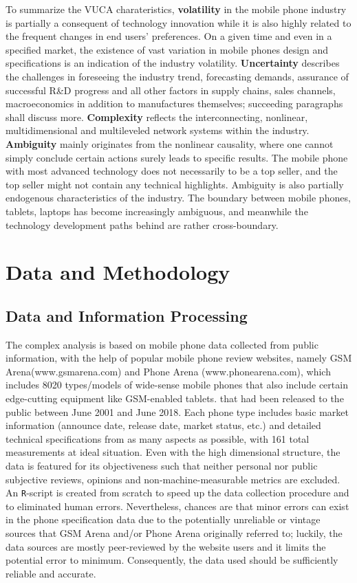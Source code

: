 \documentclass[utf8,english]{gradu3}
\begin{document}
To summarize the VUCA charateristics, \textbf{volatility} in the mobile phone industry is partially a consequent of technology innovation while it is also highly related to the frequent changes in end users’ preferences. On a given time and even in a specified market, the existence of vast variation in mobile phones design and specifications is an indication of the industry volatility. \textbf{Uncertainty} describes the challenges in foreseeing the industry trend, forecasting demands, assurance of successful R\&D progress and all other factors in supply chains, sales channels, macroeconomics in addition to manufactures themselves; succeeding paragraphs shall discuss more. \textbf{Complexity} reflects the interconnecting, nonlinear, multidimensional and multileveled network systems within the industry. \textbf{Ambiguity} mainly originates from the nonlinear causality, where one cannot simply conclude certain actions surely leads to specific results. The mobile phone with most advanced technology does not necessarily to be a top seller, and the top seller might not contain any technical highlights. Ambiguity is also partially endogenous characteristics of the industry. The boundary between mobile phones, tablets, laptops has become increasingly ambiguous, and meanwhile the technology development paths behind are rather cross-boundary.

\chapter{Data and Methodology}

\section{Data and Information Processing}

The complex analysis is based on mobile phone data collected from public information, with the help of popular mobile phone review websites, namely GSM Arena(www.gsmarena.com) and Phone Arena (www.phonearena.com), which includes 8020 types/models of wide-sense mobile phones that also include certain edge-cutting equipment like GSM-enabled tablets. that had been released to the public between June 2001 and June 2018. Each phone type includes basic market information (announce date, release date, market status, etc.) and detailed technical specifications from as many aspects as possible, with 161 total measurements at ideal situation. Even with the high dimensional structure, the data is featured for its objectiveness such that neither personal nor public subjective reviews, opinions and non-machine-measurable metrics are excluded. An \texttt{R}-script is created from scratch to speed up the data collection procedure and to eliminated human errors. Nevertheless, chances are that minor errors can exist in the phone specification data due to the potentially unreliable or vintage sources that GSM Arena and/or Phone Arena originally referred to; luckily, the data sources are mostly peer-reviewed by the website users and it limits the potential error to minimum. Consequently, the data used should be sufficiently reliable and accurate.
\end{document}
